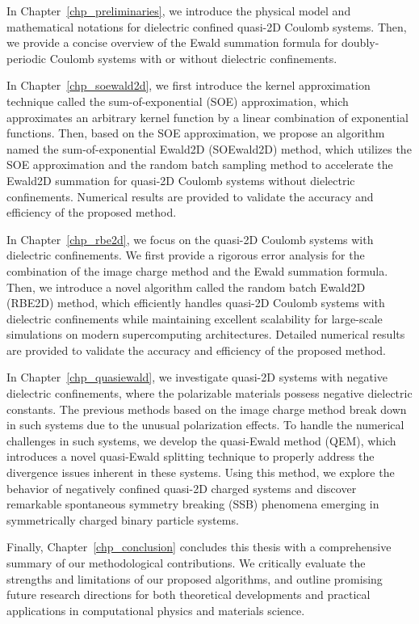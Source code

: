 In Chapter~\ref{chp_preliminaries}, we introduce the physical model and mathematical notations for dielectric confined quasi-2D Coulomb systems.
Then, we provide a concise overview of the Ewald summation formula for doubly-periodic Coulomb systems with or without dielectric confinements.

In Chapter~\ref{chp_soewald2d}, we first introduce the kernel approximation technique called the sum-of-exponential (SOE) approximation, which approximates an arbitrary kernel function by a linear combination of exponential functions.
Then, based on the SOE approximation, we propose an algorithm named the sum-of-exponential Ewald2D (SOEwald2D) method, which utilizes the SOE approximation and the random batch sampling method to accelerate the Ewald2D summation for quasi-2D Coulomb systems without dielectric confinements.
Numerical results are provided to validate the accuracy and efficiency of the proposed method.

In Chapter~\ref{chp_rbe2d}, we focus on the quasi-2D Coulomb systems with dielectric confinements.
We first provide a rigorous error analysis for the combination of the image charge method and the Ewald summation formula.
Then, we introduce a novel algorithm called the random batch Ewald2D (RBE2D) method, which efficiently handles quasi-2D Coulomb systems with dielectric confinements while maintaining excellent scalability for large-scale simulations on modern supercomputing architectures.
Detailed numerical results are provided to validate the accuracy and efficiency of the proposed method.

In Chapter~\ref{chp_quasiewald}, we investigate quasi-2D systems with negative dielectric confinements, where the polarizable materials possess negative dielectric constants.
The previous methods based on the image charge method break down in such systems due to the unusual polarization effects.
To handle the numerical challenges in such systems, we develop the quasi-Ewald method (QEM), which introduces a novel quasi-Ewald splitting technique to properly address the divergence issues inherent in these systems. 
Using this method, we explore the behavior of negatively confined quasi-2D charged systems and discover remarkable spontaneous symmetry breaking (SSB) phenomena emerging in symmetrically charged binary particle systems.

Finally, Chapter~\ref{chp_conclusion} concludes this thesis with a comprehensive summary of our methodological contributions. 
We critically evaluate the strengths and limitations of our proposed algorithms, and outline promising future research directions for both theoretical developments and practical applications in computational physics and materials science.